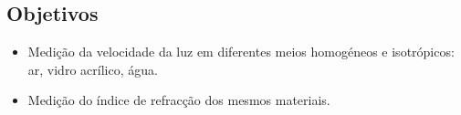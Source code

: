 \begin{center}
\begin{minipage}[c][3cm][c]{\textwidth}
\begin{center}
\section*{\centering Objetivos}
    \vspace{-3mm}
\small
\justify
\begin{itemize}
    \item Medição da velocidade da luz em diferentes meios homogéneos e isotrópicos: ar, vidro acrílico, água.
    \item Medição do índice de refracção dos mesmos materiais.
\end{itemize}
    
\end{center}
\hline


\end{minipage}
\begin{minipage}[c][2cm][c]{\textwidth}
\centering

\end{minipage}

\end{center}